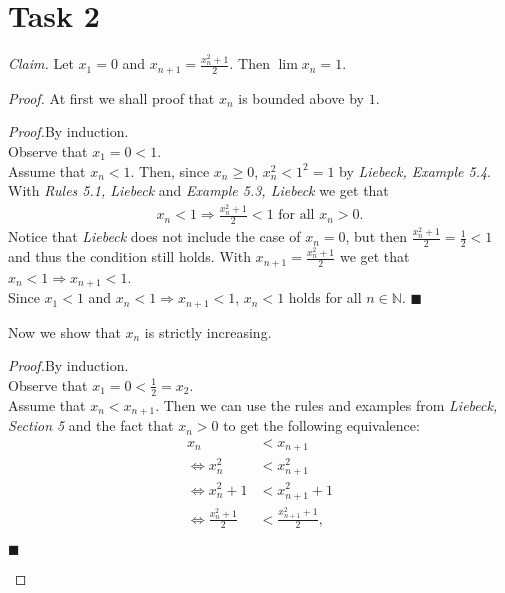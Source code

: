 \documentclass{article}
\newcommand{\N}{\mathbb{N}}
\newenvironment{claim}[1]{\noindent\emph{Claim.}\space#1}{}
\newenvironment{claimproof}[1]{\par\noindent\emph{Proof.}\space#1}{\hfill $\blacksquare$}
\begin{document}
\section*{Task 2}
\emph{Claim.} Let $x_1=0$ and $x_{n+1}=\frac{x_n^2+1}{2}$. Then $\lim x_n=1$.
\begin{proof}
At first we shall proof that $x_n$ is bounded above by $1$.
\begin{adjustwidth}{2em}{0pt}
  \begin{claimproof}
    By induction.\\
    Observe that $x_1=0<1$.\\
    Assume that $x_n<1$. Then, since $x_n\geq 0$, $x_n^2<1^2=1$ by \emph{Liebeck, Example 5.4}. With \emph{Rules 5.1, Liebeck} and \emph{Example 5.3, Liebeck} we get that
    \begin{align*}
      x_n<1 \Rightarrow \frac{x_n^2+1}{2}<1 \text{ for all } x_n > 0.
    \end{align*}
    Notice that \emph{Liebeck} does not include the case of $x_n=0$, but then $\frac{x_n^2+1}{2}=\frac{1}{2}<1$ and thus the condition still holds.
    With $x_{n+1}=\frac{x^2_n+1}{2}$ we get that $x_n<1\Rightarrow x_{n+1}<1$.\\
    Since $x_1<1$ and $x_n<1 \Rightarrow x_{n+1}<1$, $x_n<1$ holds for all $n\in\N$.
  \end{claimproof}
\end{adjustwidth}
Now we show that $x_n$ is strictly increasing.
\begin{adjustwidth}{2em}{0pt}
  \begin{claimproof}
    By induction.\\
    Observe that $x_1=0<\frac{1}{2}=x_2$.\\
    Assume that $x_n<x_{n+1}$. Then we can use the rules and examples from \emph{Liebeck, Section 5} and the fact that $x_n>0$ to get the following equivalence:
    \begin{align*}
      x_n&<x_{n+1}\\
      \Leftrightarrow x_n^2&<x_{n+1}^2\\
      \Leftrightarrow x_n^2+1&<x_{n+1}^2+1\\
      \Leftrightarrow \frac{x_n^2+1}{2}&<\frac{x_{n+1}^2+1}{2},
    \end{align*}

\end{claimproof}
\end{adjustwidth}
\end{proof}
\end{document}
